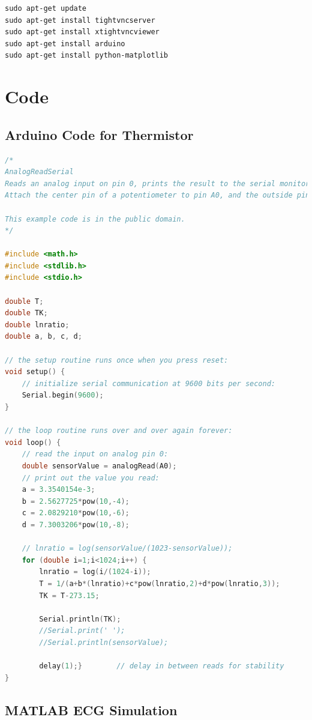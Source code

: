 \begin{lstlisting}
sudo apt-get update
sudo apt-get install tightvncserver
sudo apt-get install xtightvncviewer
sudo apt-get install arduino
sudo apt-get install python-matplotlib
\end{lstlisting}





\section{Code}

\subsection{Arduino Code for Thermistor}
\label{arduinothermistor}

\begin{lstlisting}[language=c]
/*
AnalogReadSerial
Reads an analog input on pin 0, prints the result to the serial monitor.
Attach the center pin of a potentiometer to pin A0, and the outside pins to +5V and ground.

This example code is in the public domain.
*/

#include <math.h>
#include <stdlib.h>
#include <stdio.h>

double T; 
double TK; 
double lnratio; 
double a, b, c, d; 

// the setup routine runs once when you press reset:
void setup() {
	// initialize serial communication at 9600 bits per second:
	Serial.begin(9600);
}

// the loop routine runs over and over again forever:
void loop() {
	// read the input on analog pin 0:
	double sensorValue = analogRead(A0);
	// print out the value you read:
	a = 3.3540154e-3;
	b = 2.5627725*pow(10,-4);
	c = 2.0829210*pow(10,-6);
	d = 7.3003206*pow(10,-8);
	
	// lnratio = log(sensorValue/(1023-sensorValue));
	for (double i=1;i<1024;i++) {
		lnratio = log(i/(1024-i));
		T = 1/(a+b*(lnratio)+c*pow(lnratio,2)+d*pow(lnratio,3)); 
		TK = T-273.15; 
		
		Serial.println(TK); 
		//Serial.print(' '); 
		//Serial.println(sensorValue);
		
		delay(1);}        // delay in between reads for stability
}
\end{lstlisting}

\subsection{MATLAB ECG Simulation}
\label{ecgsimulationcode}

